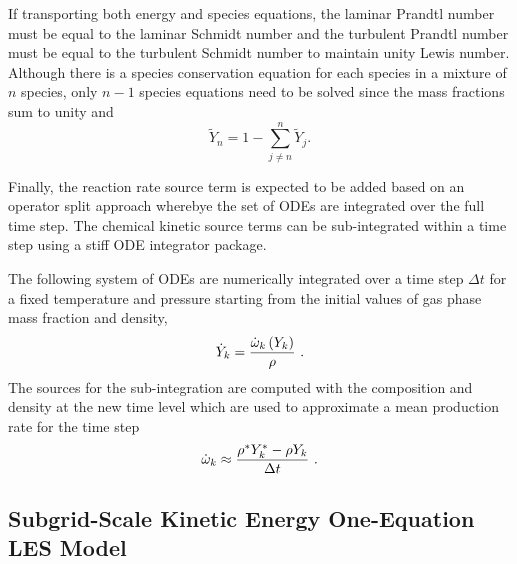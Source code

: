 If transporting both energy and species equations, the laminar Prandtl 
number must be equal to the laminar Schmidt number and the turbulent 
Prandtl number must be equal to the turbulent Schmidt number to maintain
unity Lewis number.  Although there is a species conservation equation 
for each species in a mixture of  $n$ species, only $n-1$ species equations
need to be solved since the mass fractions sum to unity and
%
\begin{equation}
  \tilde{Y}_n = 1 - \sum_{j \ne n}^{n} \tilde{Y}_j .
\end{equation}

Finally, the reaction rate source term is expected to be added based on an
operator split approach wherebye the set of ODEs are integrated over the full
time step. The chemical kinetic source terms can be sub-integrated within
a time step using a stiff ODE integrator package. 

The following system of ODEs are numerically integrated over a time 
step $\Delta t$ for a fixed temperature and pressure starting from 
the initial values of gas phase mass fraction and density,
\begin{equation}
  \dot{Y}_k = {{\dot{\omega}_k \left( Y_k \right) } \over \rho} \ .
\end{equation}
The sources for the sub-integration are computed with the composition and density at the 
new time level which are used to approximate a mean production rate for the time step
\begin{equation}
  \dot{\omega}_k \approx {{\rho^{\ast} Y^{\ast}_k - \rho Y_k}
                           \over {\Delta t}} \ .
\end{equation}

\subsection{Subgrid-Scale Kinetic Energy One-Equation LES Model}

